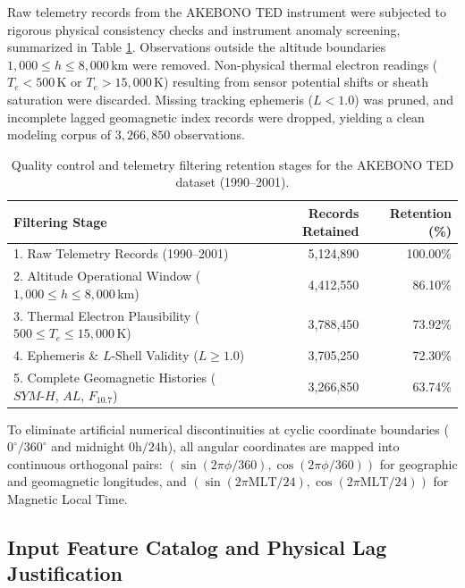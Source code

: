 \documentclass{agujournal2019}
\begin{document}
Raw telemetry records from the AKEBONO TED instrument were subjected to rigorous physical consistency checks and instrument anomaly screening, summarized in Table \ref{tab:sample_retention}. Observations outside the altitude boundaries $1{,}000 \le h \le 8{,}000$\,km were removed. Non-physical thermal electron readings ($T_e < 500$\,K or $T_e > 15{,}000$\,K) resulting from sensor potential shifts or sheath saturation were discarded. Missing tracking ephemeris ($L < 1.0$) was pruned, and incomplete lagged geomagnetic index records were dropped, yielding a clean modeling corpus of $3{,}266{,}850$ observations.

\begin{table}[htbp]
    \centering
    \caption{Quality control and telemetry filtering retention stages for the AKEBONO TED dataset (1990--2001).}
    \begin{tabular}{lrr}
        \toprule
        Filtering Stage & Records Retained & Retention (\%) \\
        \midrule
        1. Raw Telemetry Records (1990--2001) & 5,124,890 & 100.00\% \\
        2. Altitude Operational Window ($1{,}000 \le h \le 8{,}000$\,km) & 4,412,550 & 86.10\% \\
        3. Thermal Electron Plausibility ($500 \le T_e \le 15{,}000$\,K) & 3,788,450 & 73.92\% \\
        4. Ephemeris \& $L$-Shell Validity ($L \ge 1.0$) & 3,705,250 & 72.30\% \\
        5. Complete Geomagnetic Histories ($SYM\text{-}H$, $AL$, $F_{10.7}$) & 3,266,850 & 63.74\% \\
        \bottomrule
    \end{tabular}
    \label{tab:sample_retention}
\end{table}

To eliminate artificial numerical discontinuities at cyclic coordinate boundaries ($0^\circ/360^\circ$ and midnight $0\text{h}/24\text{h}$), all angular coordinates are mapped into continuous orthogonal pairs: $(\sin(2\pi \phi / 360), \cos(2\pi \phi / 360))$ for geographic and geomagnetic longitudes, and $(\sin(2\pi \text{MLT} / 24), \cos(2\pi \text{MLT} / 24))$ for Magnetic Local Time.

\subsection{Input Feature Catalog and Physical Lag Justification}
\label{data:features}
\end{document}
